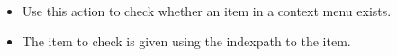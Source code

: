 
\begin{itemize}
\item Use this action to check whether an item in a context menu exists.
\item The item to check is given using the indexpath to the item. 
\end{itemize}


